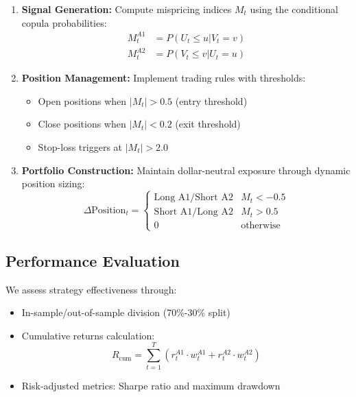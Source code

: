 \begin{enumerate}
    \item \textbf{Signal Generation:} Compute mispricing indices $ M_t $ using the conditional copula probabilities:
    \begin{align}
        M_t^{A1} &= P(U_t \leq u | V_t = v) \\
        M_t^{A2} &= P(V_t \leq v | U_t = u)
    \end{align}
    
    \item \textbf{Position Management:} Implement trading rules with thresholds:
    \begin{itemize}
        \item Open positions when $ |M_t| > 0.5 $ (entry threshold)
        \item Close positions when $ |M_t| < 0.2 $ (exit threshold)
        \item Stop-loss triggers at $ |M_t| > 2.0 $
    \end{itemize}
    
    \item \textbf{Portfolio Construction:} Maintain dollar-neutral exposure through dynamic position sizing:
    \begin{equation}
        \Delta \text{Position}_t = \begin{cases}
            \text{Long A1/Short A2} & M_t < -0.5 \\
            \text{Short A1/Long A2} & M_t > 0.5 \\
            0 & \text{otherwise}
        \end{cases}
    \end{equation}
\end{enumerate}

\subsection{Performance Evaluation}
We assess strategy effectiveness through:
\begin{itemize}
    \item In-sample/out-of-sample division (70\%-30\% split)
    \item Cumulative returns calculation:
    \begin{equation}
        R_{\text{cum}} = \sum_{t=1}^T (r_t^{A1} \cdot w_t^{A1} + r_t^{A2} \cdot w_t^{A2})
    \end{equation}
    \item Risk-adjusted metrics: Sharpe ratio and maximum drawdown
\end{itemize}

